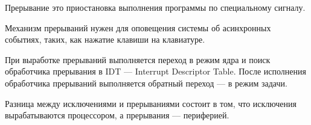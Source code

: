 \begin{defi}{Прерывание}
	это приостановка выполнения программы по специальному сигналу.
\end{defi}

Механизм прерываний нужен для оповещения системы об асинхронных событиях, таких, как нажатие клавиши на клавиатуре.

При выработке прерываний выполняется переход в режим ядра и поиск обработчика прерывания в IDT --- Interrupt Descriptor Table. После исполнения обработчика прерываний выполняется обратный переход --- в режим задачи.

Разница между исключениями и прерываниями состоит в том, что исключения вырабатываются процессором, а прерывания --- периферией.